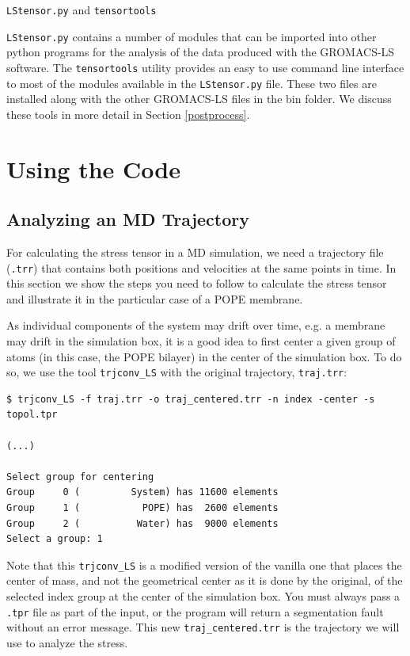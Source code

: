 \documentclass[10pt,letterpaper,notitlepage]{article}
\begin{document}
\texttt{LStensor.py} and \texttt{tensortools}

\texttt{LStensor.py} contains a number of modules that can be imported into other python programs for the analysis of the data produced with the GROMACS-LS software. The \texttt{tensortools} utility provides an easy to use command line interface to most of the modules available in the \texttt{LStensor.py} file. These two files are installed along with the other GROMACS-LS files in the bin folder. We discuss these tools in more detail in Section \ref{postprocess}.

\section{Using the Code}

\subsection{Analyzing an MD Trajectory}

For calculating the stress tensor in a MD simulation, we need a trajectory file (\texttt{.trr}) that contains both positions and velocities at the same points in time. In this section we show the steps you need to follow to calculate the stress tensor and illustrate it in the particular case of a POPE membrane. 

As individual components of the system may drift over time, e.g. a membrane may drift in the simulation box, it is a good idea to first center a given group of atoms (in this case, the POPE bilayer) in the center of the simulation box. To do so, we use the tool \texttt{trjconv\_LS} with the original trajectory, \texttt{traj.trr}:
\begin{lstlisting}[caption=Center the molecule into the simulation box before analyzing the stress]
$ trjconv_LS -f traj.trr -o traj_centered.trr -n index -center -s topol.tpr

(...)

Select group for centering
Group     0 (         System) has 11600 elements
Group     1 (           POPE) has  2600 elements
Group     2 (          Water) has  9000 elements
Select a group: 1
\end{lstlisting}
Note that this \texttt{trjconv\_LS} is a modified version of the vanilla one that places the center of mass, and not the geometrical center as it is done by the original, of the selected index group at the center of the simulation box. You must always pass a \texttt{.tpr} file as part of the input, or the program will return a segmentation fault without an error message. This new \texttt{traj\_centered.trr} is the trajectory we will use to analyze the stress.
\end{document}
